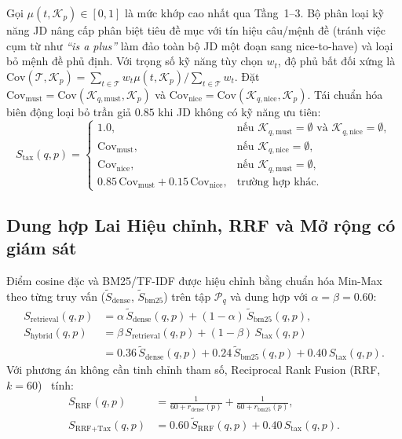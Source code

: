 Gọi $\mu(t, \mathcal{K}_p) \in [0, 1]$ là mức khớp cao nhất qua Tầng~1--3. Bộ phân loại kỹ năng JD nâng cấp phân biệt tiêu đề mục với tín hiệu câu/mệnh đề (tránh việc cụm từ như \textit{``is a plus''} làm đảo toàn bộ JD một đoạn sang nice-to-have) và loại bỏ mệnh đề phủ định. Với trọng số kỹ năng tùy chọn $w_t$, độ phủ bất đối xứng là $\text{Cov}(\mathcal{T}, \mathcal{K}_p) = \sum_{t \in \mathcal{T}} w_t \mu(t, \mathcal{K}_p) / \sum_{t \in \mathcal{T}} w_t$. Đặt $\text{Cov}_{\text{must}} = \text{Cov}(\mathcal{K}_{q,\text{must}}, \mathcal{K}_p)$ và $\text{Cov}_{\text{nice}} = \text{Cov}(\mathcal{K}_{q,\text{nice}}, \mathcal{K}_p)$. Tái chuẩn hóa biên động loại bỏ trần giả $0.85$ khi JD không có kỹ năng ưu tiên:
\begin{equation}
    S_{\text{tax}}(q, p) = \begin{cases}
        1.0, & \text{nếu } \mathcal{K}_{q,\text{must}} = \emptyset \text{ và } \mathcal{K}_{q,\text{nice}} = \emptyset, \\
        \text{Cov}_{\text{must}}, & \text{nếu } \mathcal{K}_{q,\text{nice}} = \emptyset, \\
        \text{Cov}_{\text{nice}}, & \text{nếu } \mathcal{K}_{q,\text{must}} = \emptyset, \\
        0.85\,\text{Cov}_{\text{must}} + 0.15\,\text{Cov}_{\text{nice}}, & \text{trường hợp khác.}
    \end{cases}
    \label{eq:stax_renorm}
\end{equation}

\subsection{Dung hợp Lai Hiệu chỉnh, RRF và Mở rộng có giám sát}
Điểm cosine đặc và BM25/TF-IDF được hiệu chỉnh bằng chuẩn hóa Min-Max theo từng truy vấn ($\tilde{S}_{\text{dense}}$, $\tilde{S}_{\text{bm25}}$) trên tập $\mathcal{P}_q$ và dung hợp với $\alpha = \beta = 0.60$:
\begin{equation}
\begin{aligned}
    S_{\text{retrieval}}(q, p) &= \alpha\,\tilde{S}_{\text{dense}}(q, p) + (1 - \alpha)\,\tilde{S}_{\text{bm25}}(q, p), \\
    S_{\text{hybrid}}(q, p) &= \beta\,S_{\text{retrieval}}(q, p) + (1 - \beta)\,S_{\text{tax}}(q, p) \\
    &= 0.36\,\tilde{S}_{\text{dense}}(q, p) + 0.24\,\tilde{S}_{\text{bm25}}(q, p) + 0.40\,S_{\text{tax}}(q, p).
\end{aligned}
\label{eq:hybrid_full}
\end{equation}
Với phương án không cần tinh chỉnh tham số, Reciprocal Rank Fusion (RRF, $k=60$)~\cite{cormack2009reciprocal} tính:
\begin{equation}
\begin{aligned}
    S_{\text{RRF}}(q, p) &= \frac{1}{60 + r_{\text{dense}}(p)} + \frac{1}{60 + r_{\text{bm25}}(p)}, \\
    S_{\text{RRF+Tax}}(q, p) &= 0.60\,\tilde{S}_{\text{RRF}}(q, p) + 0.40\,S_{\text{tax}}(q, p).
\end{aligned}
\label{eq:rrf}
\end{equation}


